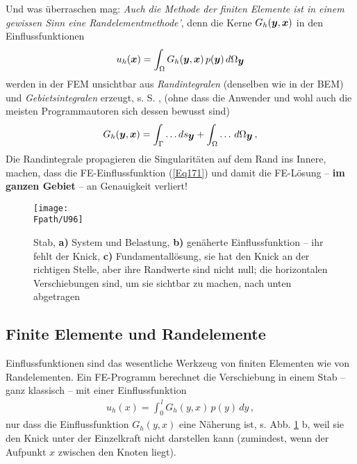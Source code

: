 {{{{Und was \"{u}berraschen mag: {\em Auch die Methode der finiten Elemente ist in einem gewissen Sinn eine
\glq Randelementmethode'\/}, denn die Kerne $G_h(\mbox{\boldmath $y$},\mbox{\boldmath $x$})$ in den Einflussfunktionen
\begin{align}\label{Eq171}
u_h(\mbox{\boldmath $x$}) = \int_{\Omega} G_h(\mbox{\boldmath $y$},\mbox{\boldmath $x$})\,p(\mbox{\boldmath $y$})\,d\Omega_{\mbox{\boldmath $y$}}
\end{align}
werden in der FEM \glq unsichtbar\grq{} aus {\em Randintegralen\/} (denselben wie in der BEM) und {\em Gebietsintegralen\/} erzeugt, s. S. \pageref{SingInf}, (ohne dass die Anwender und wohl auch die meisten Programmautoren sich dessen bewusst sind)
\begin{align}
G_h(\mbox{\boldmath $y$},\mbox{\boldmath $x$}) = \int_{\Gamma} \ldots ds_{\mbox{\boldmath $y$}} + \int_{\Omega} \ldots \,d\Omega_{\mbox{\boldmath $y$}}\,,
\end{align}
Die Randintegrale propagieren die Singularit\"{a}ten auf dem Rand ins Innere, machen, dass die FE-Einflussfunkti\-on (\ref{Eq171}) und damit die FE-L\"{o}sung -- {\bf im ganzen Gebiet} -- an Genauigkeit verliert!

\begin{figure}[tbp]
\centering
\if {} \sidecaption \fi
\texttt{[image: \\Fpath/U96]}
\caption{Stab,  \textbf{ a)} System und Belastung,  \textbf{ b)} gen\"{a}herte Einflussfunktion -- ihr fehlt der Knick,  \textbf{ c)} Fundamentall\"{o}sung, sie hat den Knick an der richtigen Stelle, aber ihre Randwerte sind nicht null; die horizontalen Verschiebungen sind, um sie sichtbar zu machen, nach unten abgetragen}
\label{U96}
\end{figure}%

{\textcolor{sectionTitleBlue}{\section{Finite Elemente und Randelemente}}}
Einflussfunktionen sind das wesentliche Werkzeug von finiten Elementen wie von Randelementen. Ein FE-Programm berechnet die Verschiebung in einem Stab -- ganz klassisch -- mit einer Einflussfunktion
\begin{align}
u_h(x) = \int_0^{\,l} G_h(y,x)\,p(y)\,dy\,,
\end{align}
nur dass die Einflussfunktion $G_h(y,x)$ eine N\"{a}herung ist, s. Abb. \ref{U96} b, weil sie den Knick unter der Einzelkraft nicht darstellen kann (zumindest, wenn der Aufpunkt $x$ zwischen den Knoten liegt).

}}}}
